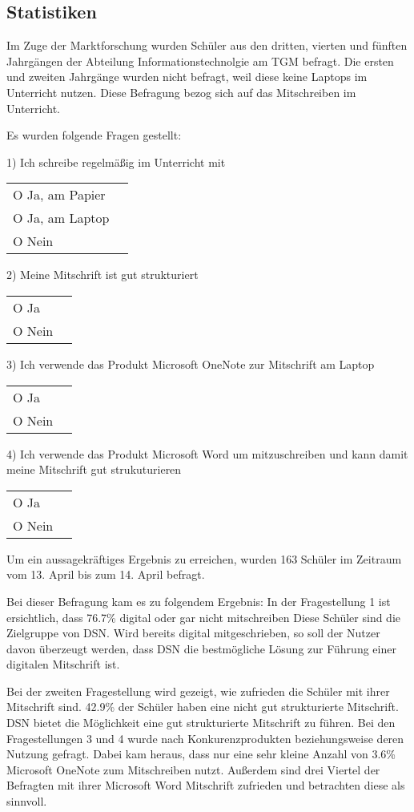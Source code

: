 
\subsection{Statistiken}
Im Zuge der Marktforschung wurden Schüler aus den dritten, vierten und fünften Jahrgängen der Abteilung Informationstechnolgie am TGM befragt. Die ersten und zweiten Jahrgänge wurden nicht befragt, weil diese keine Laptops im Unterricht nutzen. Diese Befragung bezog sich auf das Mitschreiben im Unterricht. 

Es wurden folgende Fragen gestellt:

1) Ich schreibe regelmäßig im Unterricht mit\\
	\begin{tabular}[t]{lr}
	O Ja, am Papier\\
	O Ja, am Laptop\\
	O Nein
	\end{tabular}
	

2) Meine Mitschrift ist gut strukturiert\\
	\begin{tabular}[t]{lr}
	O Ja\\
	O Nein
	\end{tabular}

3) Ich verwende das Produkt Microsoft OneNote zur Mitschrift am Laptop\\
	\begin{tabular}[t]{lr}
	O Ja\\
	O Nein
	\end{tabular}
	
4) Ich verwende das Produkt Microsoft Word um mitzuschreiben und kann damit meine Mitschrift gut strukuturieren\\
	\begin{tabular}[t]{lr}
	O Ja\\
	O Nein
	\end{tabular}
	
Um ein aussagekräftiges Ergebnis zu erreichen, wurden 163 Schüler im Zeitraum vom 13. April bis zum 14. April befragt.
\newpage

Bei dieser Befragung kam es zu folgendem Ergebnis:
In der Fragestellung 1 ist ersichtlich, dass 76.7\% digital oder gar nicht mitschreiben
Diese Schüler sind die Zielgruppe von DSN. Wird bereits digital mitgeschrieben, so soll der Nutzer davon überzeugt werden, dass DSN die bestmögliche Lösung zur Führung einer digitalen Mitschrift ist. 

Bei der zweiten Fragestellung wird gezeigt, wie zufrieden die Schüler mit ihrer Mitschrift sind. 42.9\% der Schüler haben eine nicht gut strukturierte Mitschrift. DSN bietet die Möglichkeit eine gut strukturierte Mitschrift zu führen. 
Bei den Fragestellungen 3 und 4 wurde nach Konkurenzprodukten beziehungsweise deren Nutzung gefragt. Dabei kam heraus, dass nur eine sehr kleine Anzahl von 3.6\% Microsoft OneNote zum Mitschreiben nutzt. Außerdem sind drei Viertel der Befragten mit ihrer Microsoft Word Mitschrift zufrieden und betrachten diese als sinnvoll. 
\newpage
